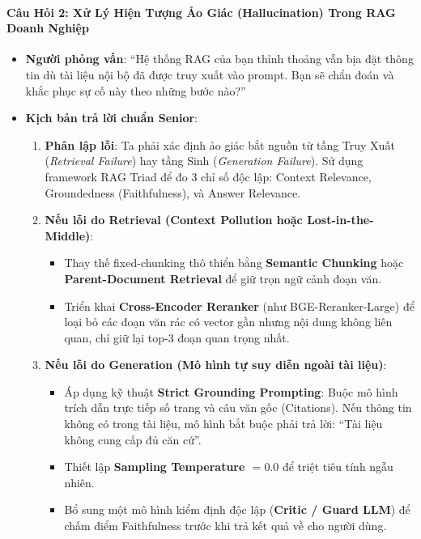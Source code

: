 \paragraph{Câu Hỏi 2: Xử Lý Hiện Tượng Ảo Giác (Hallucination) Trong RAG Doanh Nghiệp}
\begin{itemize}
  \item \textbf{Người phỏng vấn}: ``Hệ thống RAG của bạn thỉnh thoảng vẫn bịa đặt thông tin dù tài liệu nội bộ đã được truy xuất vào prompt. Bạn sẽ chẩn đoán và khắc phục sự cố này theo những bước nào?''
  \item \textbf{Kịch bản trả lời chuẩn Senior}:
  \begin{enumerate}
    \item \textbf{Phân lập lỗi}: Ta phải xác định ảo giác bắt nguồn từ tầng Truy Xuất (\textit{Retrieval Failure}) hay tầng Sinh (\textit{Generation Failure}). Sử dụng framework RAG Triad để đo 3 chỉ số độc lập: Context Relevance, Groundedness (Faithfulness), và Answer Relevance.
    \item \textbf{Nếu lỗi do Retrieval (Context Pollution hoặc Lost-in-the-Middle)}:
    \begin{itemize}
      \item Thay thế fixed-chunking thô thiển bằng \textbf{Semantic Chunking} hoặc \textbf{Parent-Document Retrieval} để giữ trọn ngữ cảnh đoạn văn.
      \item Triển khai \textbf{Cross-Encoder Reranker} (như BGE-Reranker-Large) để loại bỏ các đoạn văn rác có vector gần nhưng nội dung không liên quan, chỉ giữ lại top-3 đoạn quan trọng nhất.
    \end{itemize}
    \item \textbf{Nếu lỗi do Generation (Mô hình tự suy diễn ngoài tài liệu)}:
    \begin{itemize}
      \item Áp dụng kỹ thuật \textbf{Strict Grounding Prompting}: Buộc mô hình trích dẫn trực tiếp số trang và câu văn gốc (Citations). Nếu thông tin không có trong tài liệu, mô hình bắt buộc phải trả lời: ``Tài liệu không cung cấp đủ căn cứ''.
      \item Thiết lập \textbf{Sampling Temperature $= 0.0$} để triệt tiêu tính ngẫu nhiên.
      \item Bổ sung một mô hình kiểm định độc lập (\textbf{Critic / Guard LLM}) để chấm điểm Faithfulness trước khi trả kết quả về cho người dùng.
    \end{itemize}
  \end{enumerate}
\end{itemize}




